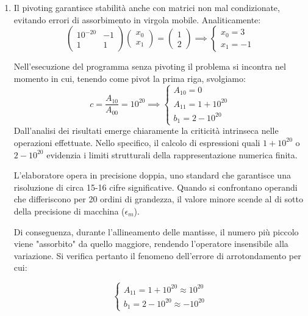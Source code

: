 \documentclass[11pt, a4paper]{article}
\begin{document}
\begin{enumerate}[resume=miolista]
    \item Il pivoting garantisce stabilità anche con matrici non mal condizionate, evitando errori di assorbimento in virgola mobile. Analiticamente:
    \[
    \begin{pmatrix} 10^{-20} & -1 \\ 1 & 1 \end{pmatrix}
    \begin{pmatrix} x_0 \\ x_1 \end{pmatrix} =
    \begin{pmatrix} 1 \\ 2 \end{pmatrix} \implies
    \begin{cases} x_0 = 3 \\ x_1 = -1 \end{cases}
    \]

    Nell'esecuzione del programma senza pivoting il problema si incontra nel momento in cui, tenendo come pivot la prima riga, svolgiamo:
    $$c =\frac{A_{10}}{A_{00}}=10^{20} \implies
    \begin{cases}
        A_{10} = 0 \\
        A_{11} = 1+10^{20}\\
        b_1 = 2-10^{20}
    \end{cases}    
    $$    
    Dall'analisi dei risultati emerge chiaramente la criticità intrinseca nelle operazioni effettuate. Nello specifico, il calcolo di espressioni quali $1+10^{20}$ o $2-10^{20}$ evidenzia i limiti strutturali della rappresentazione numerica finita.
    
    L'elaboratore opera in precisione doppia, uno standard che garantisce una risoluzione di circa 15-16 cifre significative. Quando si confrontano operandi che differiscono per 20 ordini di grandezza, il valore minore scende al di sotto della precisione di macchina ($\epsilon_m$). 
    
    Di conseguenza, durante l'allineamento delle mantisse, il numero più piccolo viene "assorbito" da quello maggiore, rendendo l'operatore insensibile alla variazione. Si verifica pertanto il fenomeno dell'errore di arrotondamento per cui:
    
    $$
    \begin{cases}
        A_{11} = 1+10^{20} \approx 10^{20}\\
        b_1 = 2-10^{20} \approx -10^{20}
    \end{cases}    
    $$    
    

\end{enumerate}
\end{document}
